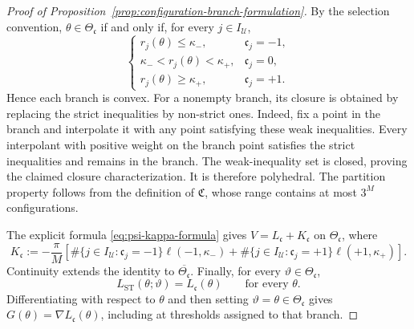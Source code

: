 \begin{proof}[Proof of Proposition~\ref{prop:configuration-branch-formulation}]
By the selection convention, $\theta\in\Theta_{\mathfrak c}$
if and only if, for every $j\in I_{\mathcal U}$,
\[
    \begin{cases}
        r_j(\theta)\leq\kappa_-,
            & \mathfrak c_j=-1,\\
        \kappa_-<r_j(\theta)<\kappa_+,
            & \mathfrak c_j=0,\\
        r_j(\theta)\geq\kappa_+,
            & \mathfrak c_j=+1.
    \end{cases}
\]
Hence each branch is convex.
For a nonempty branch, its closure is obtained by replacing
the strict inequalities by non-strict ones.
Indeed, fix a point in the branch and interpolate it with
any point satisfying these weak inequalities.
Every interpolant with positive weight on the branch point
satisfies the strict inequalities and remains in the branch.
The weak-inequality set is closed, proving the claimed
closure characterization. It is therefore polyhedral.
The partition property follows from the definition of
$\mathfrak C$, whose range contains at most $3^M$ configurations.

The explicit formula \eqref{eq:psi-kappa-formula} gives
$V=L_{\mathfrak c}+K_{\mathfrak c}$ on $\Theta_{\mathfrak c}$,
where
\[
    K_{\mathfrak c}
    :=
    -\frac{\pi}{M}
    \left[
        \#\{j\in I_{\mathcal U}:\mathfrak c_j=-1\}
            \ell(-1,\kappa_-)
        +
        \#\{j\in I_{\mathcal U}:\mathfrak c_j=+1\}
            \ell(+1,\kappa_+)
    \right].
\]
Continuity extends the identity to
$\overline{\Theta_{\mathfrak c}}$.
Finally, for every $\vartheta\in\Theta_{\mathfrak c}$,
\[
    L_{\mathrm{ST}}(\theta;\vartheta)
    =
    L_{\mathfrak c}(\theta)
    \qquad\text{for every }\theta.
\]
Differentiating with respect to $\theta$ and then setting
$\vartheta=\theta\in\Theta_{\mathfrak c}$ gives
$G(\theta)=\nabla L_{\mathfrak c}(\theta)$, including at thresholds
assigned to that branch.
\end{proof}

